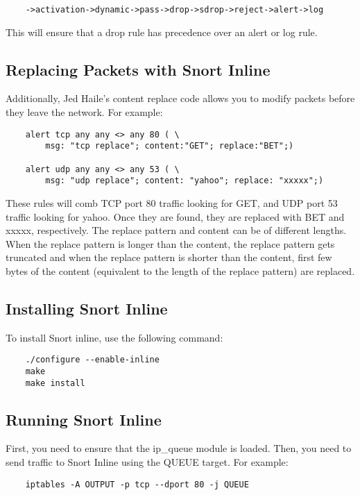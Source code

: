 \documentclass[english]{report}
\begin{document}
\begin{verbatim}
    ->activation->dynamic->pass->drop->sdrop->reject->alert->log
\end{verbatim}

This will ensure that a drop rule has precedence over an alert or log rule.

\subsection{Replacing Packets with Snort Inline}
\label{ReplaceInline}

Additionally, Jed Haile's content replace code allows you to modify packets
before they leave the network.  For example:

\begin{verbatim}
    alert tcp any any <> any 80 ( \
        msg: "tcp replace"; content:"GET"; replace:"BET";)

    alert udp any any <> any 53 ( \
        msg: "udp replace"; content: "yahoo"; replace: "xxxxx";)
\end{verbatim}

These rules will comb TCP port 80 traffic looking for GET, and UDP port 53
traffic looking for yahoo. Once they are found, they are replaced with BET and
xxxxx, respectively. The replace pattern  and content can be of different 
lengths. When the replace pattern is longer than the content, the replace
pattern gets truncated and when the replace pattern is shorter than the content,
first few bytes of the content (equivalent to the length of the replace pattern) 
are replaced. 

\subsection{Installing Snort Inline}
\label{InlineInstall}
To install Snort inline, use the following command:
\begin{verbatim}
    ./configure --enable-inline
    make
    make install
\end{verbatim} 

\subsection{Running Snort Inline}

First, you need to ensure that the ip\_queue module is loaded.  Then, you need
to send traffic to Snort Inline using the QUEUE target.  For example:

\begin{verbatim}
    iptables -A OUTPUT -p tcp --dport 80 -j QUEUE
\end{verbatim}
\end{document}
